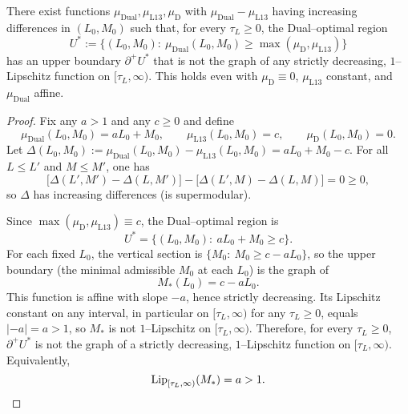 ﻿\begin{theorem}\label{thm:dual-upper-nongraph}
There exist functions $\mu_{\mathrm{Dual}},\mu_{\mathrm{L13}},\mu_{\mathrm{D}}$ with $\mu_{\mathrm{Dual}}-\mu_{\mathrm{L13}}$ having increasing differences in $(L_0,M_0)$ such that, for every $\tau_L\ge0$, the Dual--optimal region
\[
U^*:=\{(L_0,M_0):\ \mu_{\mathrm{Dual}}(L_0,M_0)\ge\max(\mu_{\mathrm{D}},\mu_{\mathrm{L13}})\}
\]
has an upper boundary $\partial^+U^*$ that is not the graph of any strictly decreasing, $1$--Lipschitz function on $[\tau_L,\infty)$. This holds even with $\mu_{\mathrm{D}}\equiv0$, $\mu_{\mathrm{L13}}$ constant, and $\mu_{\mathrm{Dual}}$ affine.
\end{theorem}

\begin{proof}
Fix any $a>1$ and any $c\ge0$ and define
\[
\mu_{\mathrm{Dual}}(L_0,M_0)=aL_0+M_0,\qquad \mu_{\mathrm{L13}}(L_0,M_0)=c,\qquad \mu_{\mathrm{D}}(L_0,M_0)=0.
\]
Let $\Delta(L_0,M_0):=\mu_{\mathrm{Dual}}(L_0,M_0)-\mu_{\mathrm{L13}}(L_0,M_0)=aL_0+M_0-c$. For all $L\le L'$ and $M\le M'$, one has
\[
\big[\Delta(L',M')-\Delta(L,M')\big]-\big[\Delta(L',M)-\Delta(L,M)\big]=0\ge0,
\]
so $\Delta$ has increasing differences (is supermodular).

Since $\max(\mu_{\mathrm{D}},\mu_{\mathrm{L13}})\equiv c$, the Dual--optimal region is
\[
U^* = \{(L_0,M_0):\ aL_0+M_0\ge c\}.
\]
For each fixed $L_0$, the vertical section is $\{M_0:\ M_0\ge c-aL_0\}$, so the upper boundary (the minimal admissible $M_0$ at each $L_0$) is the graph of
\[
M_*(L_0)=c-aL_0.
\]
This function is affine with slope $-a$, hence strictly decreasing. Its Lipschitz constant on any interval, in particular on $[\tau_L,\infty)$ for any $\tau_L\ge0$, equals $|{-}a|=a>1$, so $M_*$ is not $1$--Lipschitz on $[\tau_L,\infty)$. Therefore, for every $\tau_L\ge0$, $\partial^+U^*$ is not the graph of a strictly decreasing, $1$--Lipschitz function on $[\tau_L,\infty)$. Equivalently,
\[
\operatorname{Lip}_{[\tau_L,\infty)}(M_*)=a>1.\qedhere
\]
\end{proof}
